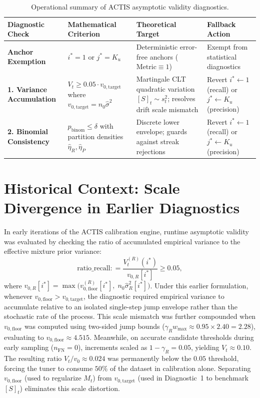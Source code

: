 \documentclass[11pt,a4paper]{article}
\newcommand{\coloneqq}{\mathrel{\mathop:}=}
\begin{document}
\begin{table}[ht]
\centering
\small
\caption{Operational summary of ACTIS asymptotic validity diagnostics.}\label{tab:diagnostic_summary}
\begin{tabular}{p{3.2cm}p{3.5cm}p{3.8cm}p{3.5cm}}
\toprule
Diagnostic Check & Mathematical Criterion & Theoretical Target & Fallback Action \\
\midrule
\textbf{Anchor Exemption} & $i^* = 1$ or $j^* = K_u$ & Deterministic error-free anchors ($\text{Metric} \equiv 1$) & Exempt from statistical diagnostics \\
\midrule
\textbf{1. Variance Accumulation} & $V_t \ge 0.05 \cdot v_{0, \text{target}}$ where $v_{0, \text{target}} = n_0 \hat{\sigma}^2$ & Martingale CLT quadratic variation $[S]_t \sim s_t^2$; resolves drift scale mismatch & Revert $i^* \leftarrow 1$ (recall) or $j^* \leftarrow K_u$ (precision) \\
\midrule
\textbf{2. Binomial Consistency} & $p_{\text{binom}} \le \delta$ with partition densities $\hat{\eta}_R, \hat{\eta}_P$ & Discrete lower envelope; guards against streak rejections & Revert $i^* \leftarrow 1$ (recall) or $j^* \leftarrow K_u$ (precision) \\
\bottomrule
\end{tabular}
\end{table}

\appendix
\section{Historical Context: Scale Divergence in Earlier Diagnostics}
In early iterations of the ACTIS calibration engine, runtime asymptotic validity was evaluated by checking the ratio of accumulated empirical variance to the effective mixture prior variance:
\begin{equation}
\text{ratio\_recall} \coloneqq \frac{V_t^{(R)}(i^*)}{v_{0, R}[i^*]} \ge 0.05,
\end{equation}
where $v_{0, R}[i^*] = \max\big(v_{0, \text{floor}}^{(R)}[i^*], \; n_0 \hat{\sigma}_R^2[i^*]\big)$.
Under this earlier formulation, whenever $v_{0, \text{floor}} > v_{0, \text{target}}$, the diagnostic required empirical variance to accumulate relative to an isolated single-step jump envelope rather than the stochastic rate of the process. This scale mismatch was further compounded when $v_{0, \text{floor}}$ was computed using two-sided jump bounds ($\gamma_R w_{\max} \approx 0.95 \times 2.40 = 2.28$), evaluating to $v_{0, \text{floor}} \approx 4.515$. Meanwhile, on accurate candidate thresholds during early sampling ($n_{\text{FN}} = 0$), increments scaled as $1 - \gamma_R = 0.05$, yielding $V_t \approx 0.10$. The resulting ratio $V_t / v_0 \approx 0.024$ was permanently below the $0.05$ threshold, forcing the tuner to consume $50\%$ of the dataset in calibration alone. 
Separating $v_{0, \text{floor}}$ (used to regularize $M_t$) from $v_{0, \text{target}}$ (used in Diagnostic~1 to benchmark $[S]_t$) eliminates this scale distortion.
\end{document}
